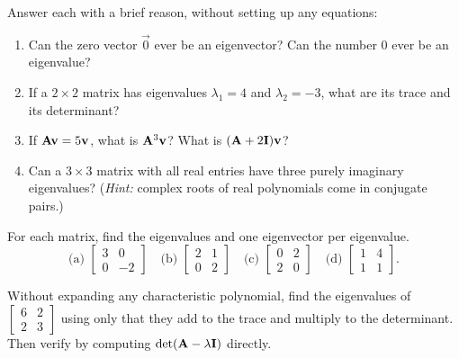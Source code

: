 \begin{exercise}
\label{ch23:ex-quick-checks}
Answer each with a brief reason, without setting up any equations:
\begin{enumerate}[label=\textbf{(\alph*)}]
  \item Can the zero vector $\vec{0}$ ever be an eigenvector? Can the number $0$ ever be an eigenvalue?
  \item If a $2\times 2$ matrix has eigenvalues $\lambda_1 = 4$ and $\lambda_2 = -3$, what are its trace and its determinant?
  \item If $\mathbf{A}\mathbf{v} = 5\mathbf{v}$, what is $\mathbf{A}^3\mathbf{v}$? What is $(\mathbf{A}+2\mathbf{I})\mathbf{v}$?
  \item Can a $3\times 3$ matrix with all real entries have three purely imaginary eigenvalues? (\emph{Hint:} complex roots of real polynomials come in conjugate pairs.)
\end{enumerate}
\end{exercise}

\begin{exercise}
\label{ch23:ex-warm}
For each matrix, find the eigenvalues and one eigenvector per eigenvalue.
\[
  \text{(a) } \begin{bmatrix}3 & 0\\ 0 & -2\end{bmatrix}\quad
  \text{(b) } \begin{bmatrix}2 & 1\\ 0 & 2\end{bmatrix}\quad
  \text{(c) } \begin{bmatrix}0 & 2\\ 2 & 0\end{bmatrix}\quad
  \text{(d) } \begin{bmatrix}1 & 4\\ 1 & 1\end{bmatrix}.
\]
\end{exercise}

\begin{exercise}
\label{ch23:ex-tracedet-only}
Without expanding any characteristic polynomial, find the eigenvalues of
$\begin{bmatrix}6 & 2\\ 2 & 3\end{bmatrix}$ using only that they add to the trace
and multiply to the determinant. Then verify by computing
$\det(\mathbf{A}-\lambda\mathbf{I})$ directly.
\end{exercise}

